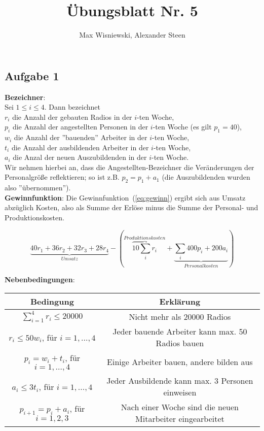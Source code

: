 \documentclass[11pt,a4paper,ngerman]{article}
\date{}
\title{Übungsblatt Nr. 5}
\author{Max Wisniewski, Alexander Steen}
\begin{document}
\renewcommand{\figurename}{Figure}
\maketitle
\thispagestyle{fancy}


\subsection*{Aufgabe 1}

\textbf{Bezeichner}:\\
Sei $1 \leq i \leq 4$. Dann bezeichnet \\
$r_i$ die Anzahl der gebauten Radios in der $i$-ten Woche,\\
$p_i$ die Anzahl der angestellten Personen in der $i$-ten Woche (es gilt $p_1 = 40$), \\
$w_i$ die Anzahl der ''bauenden'' Arbeiter in der $i$-ten Woche, \\
$t_i$ die Anzahl der ausbildenden Arbeiter in der $i$-ten Woche, \\
$a_i$ die Anzal der neuen Auszubildenden in der $i$-ten Woche. \\

Wir nehmen hierbei an, dass die Angestellten-Bezeichner die Veränderungen der Personalgröße reflektieren; so ist z.B. $p_2 = p_1 + a_1$ (die Auszubildenden wurden also ''übernommen''). \\

\textbf{Gewinnfunktion}: Die Gewinnfunktion~(\ref{eq:gewinn}) ergibt sich aus Umsatz abzüglich Kosten, also als Summe der Erlöse minus die Summe der Personal- und Produktionskosten. 

\begin{equation}\label{eq:gewinn}
 \underbrace{40r_1 + 36r_2 + 32r_3 + 28r_4}_{Umsatz} - \left(\overbrace{10\sum_i r_i}^{Produktionskosten}
 + \underbrace{\sum_i 400p_i + 200a_i}_{Personalkosten} \right)
\end{equation}

\textbf{Nebenbedingungen}: \\
\begin{tabular}{c|c}
Bedingung & Erklärung \\
\hline \hline
$\sum_{i=1}^4 r_i \leq 20000$ & Nicht mehr als 20000 Radios\\
$r_i \leq 50w_i$, für $i = 1,\ldots,4$ & Jeder bauende Arbeiter kann max. 50 Radios bauen \\
$p_i = w_i + t_i$, für $i = 1,\ldots,4$ & Einige Arbeiter bauen, andere bilden aus \\
$a_i \leq 3 t_i$, für $i = 1,\ldots,4$ & Jeder Ausbildende kann max. 3 Personen einweisen \\
$p_{i+1} = p_i + a_i$, für $i = 1,2,3$ & Nach einer Woche sind die neuen Mitarbeiter eingearbeitet 
\end{tabular}
\end{document}
